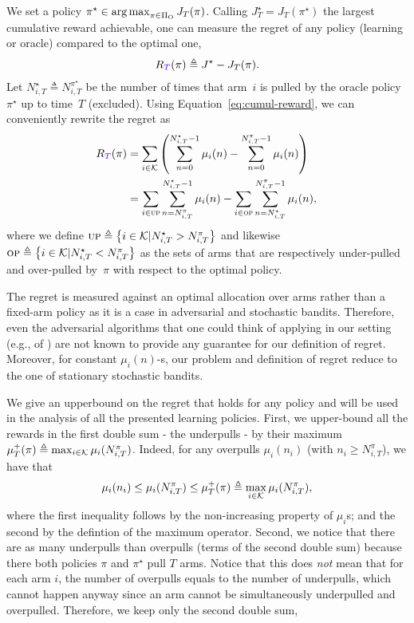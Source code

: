 We set a policy $\pi^\star\in \operatorname*{arg\,max}_{\pi \in \Pi_{\rm O}} J_T(\pi)$. Calling $J_T^\star = J_T(\pi^\star)$ the largest cumulative reward achievable, one can measure the regret of any policy (learning or oracle) compared to the optimal one, 
\begin{align}\label{eq:regret}
\regret(\pi) \triangleq J^\star - J_T(\pi).
\end{align}
%
Let $N_{i,T}^\star \triangleq N_{i,T}^{\pi^\star}$ be the number of times that arm~$i$ is pulled by the oracle policy $\pi^\star$ up to time~$T$ (excluded).  Using Equation~\ref{eq:cumul-reward},  we can conveniently rewrite the regret as
%
\begin{align}
\!\regret(\pi) &= \sum_{i\in\possibleArms}\left( \sum_{n=0}^{N_{i,T}^\star-1}  \reward_{i}(n)  - \sum_{n=0}^{N_{i,T}^\pi-1}  \mu_{i}(n) \right) \nonumber\\ 
& = \sum_{i \in \underpullSet}\sum_{n=N_{i, T}^{\pi}}^{N_{i, T}^{\star}-1} \mu_i(n) - \sum_{i \in \overpullSet} \sum_{n=N_{i, T}^{\star}}^{N_{i, T}^{\pi}-1} \mu_i(n),\label{eq:regret2}
\end{align}
%
where we define $\textsc{up} \triangleq \left\{ i \in \mathcal{K} | N_{i, T}^{\star} > N_{i, T}^{\pi} \right\}$ and likewise $\textsc{op} \triangleq \left\{ i\in \mathcal{K} | N_{i, T}^{\star} < N_{i, T}^{\pi}\right\}$ as the sets of arms that are respectively under-pulled and over-pulled by~$\pi$ with respect to the optimal policy.
%
\begin{remark}
The regret is measured against an optimal allocation over arms rather than a fixed-arm policy as it is a case in adversarial and stochastic bandits. Therefore, even the adversarial algorithms that one could think of applying in our setting (e.g., \EXP of \citet{auer2002finite}) are not known to provide any guarantee for our definition of regret. Moreover, for constant $\mu_i(n)$-s, our problem and definition of regret reduce to the one of stationary stochastic bandits. 
\end{remark}
%
We give an upperbound on the regret that holds for any policy and will be used in the analysis of all the presented learning policies. First, we upper-bound all the rewards in the first double sum - the underpulls - by their maximum $\mu^+_T(\pi) \triangleq \max_{i\in\mathcal{K}} \mu_i(N_{i,T}^\pi)$. Indeed, for any overpulls $\mu_i(n_i) $ (with  $n_i \geq N_{i,T}^\pi$), we have that
\[
\mu_i(n_i) \leq \mu_i(N_{i,T}^\pi) \leq \mu^+_T(\pi)  \triangleq \max_{i\in\mathcal{K}} \mu_i(N_{i,T}^\pi),
\]
where the first inequality follows by the non-increasing property of $\mu_i$s; and the second by the defintion of the maximum operator. Second, we notice that there are as many underpulls than overpulls (terms of the second double sum) because there both policies $ \pi$ and $\pi^\star$ pull $T$ arms. Notice that this does \emph{not} mean that for each arm $i$, the number of overpulls equals to the number of underpulls, which cannot happen anyway since an arm cannot be simultaneously underpulled and overpulled. Therefore, we keep only the second double sum,
